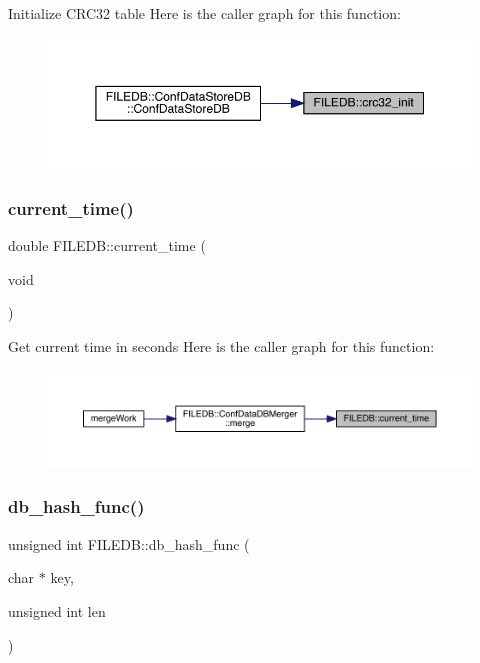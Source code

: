 Initialize C\+R\+C32 table Here is the caller graph for this function\+:
\nopagebreak
\begin{figure}[H]
\begin{center}
\leavevmode
\includegraphics[width=350pt]{d2/de6/namespaceFILEDB_ad0296230a6c6ba4b757820d4367275a4_icgraph}
\end{center}
\end{figure}
\mbox{\label{namespaceFILEDB_a52d0505cdd535797c05bffb0598ef2a5}} 
\subsubsection{\texorpdfstring{current\_time()}{current\_time()}}
{\footnotesize\ttfamily double F\+I\+L\+E\+D\+B\+::current\+\_\+time (\begin{DoxyParamCaption}\item[{void}]{ }\end{DoxyParamCaption})}

Get current time in seconds Here is the caller graph for this function\+:
\nopagebreak
\begin{figure}[H]
\begin{center}
\leavevmode
\includegraphics[width=350pt]{d2/de6/namespaceFILEDB_a52d0505cdd535797c05bffb0598ef2a5_icgraph}
\end{center}
\end{figure}
\mbox{\label{namespaceFILEDB_a506040cd2b9f1527e415461aac226fb5}} 
\subsubsection{\texorpdfstring{db\_hash\_func()}{db\_hash\_func()}}
{\footnotesize\ttfamily unsigned int F\+I\+L\+E\+D\+B\+::db\+\_\+hash\+\_\+func (\begin{DoxyParamCaption}\item[{char $\ast$}]{key,  }\item[{unsigned int}]{len }\end{DoxyParamCaption})}

